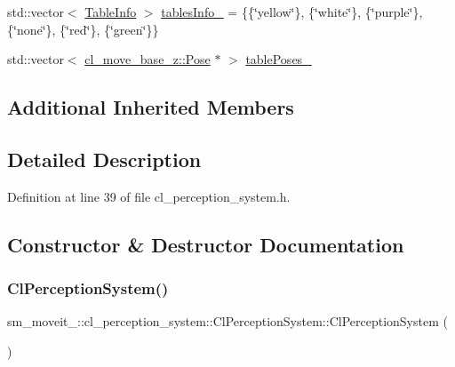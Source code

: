 \begin{DoxyCompactItemize}
\item 
std\+::vector$<$ \hyperlink{structsm__moveit__4_1_1cl__perception__system_1_1TableInfo}{Table\+Info} $>$ \hyperlink{classsm__moveit__4_1_1cl__perception__system_1_1ClPerceptionSystem_a21ceecf8b19768639b21493c2d822ec2}{tables\+Info\+\_\+} = \{\{\char`\"{}yellow\char`\"{}\}, \{\char`\"{}white\char`\"{}\}, \{\char`\"{}purple\char`\"{}\}, \{\char`\"{}none\char`\"{}\}, \{\char`\"{}red\char`\"{}\}, \{\char`\"{}green\char`\"{}\}\}
\item 
std\+::vector$<$ \hyperlink{classcl__move__base__z_1_1Pose}{cl\+\_\+move\+\_\+base\+\_\+z\+::\+Pose} $\ast$ $>$ \hyperlink{classsm__moveit__4_1_1cl__perception__system_1_1ClPerceptionSystem_a3a1e9a71ee18c12bac7d76810c164996}{table\+Poses\+\_\+}
\end{DoxyCompactItemize}
\subsection*{Additional Inherited Members}


\subsection{Detailed Description}


Definition at line 39 of file cl\+\_\+perception\+\_\+system.\+h.



\subsection{Constructor \& Destructor Documentation}
\mbox{\label{classsm__moveit__4_1_1cl__perception__system_1_1ClPerceptionSystem_aeb969985d995c4ba91f1f2f693fe2c3a}} 
\subsubsection{\texorpdfstring{Cl\+Perception\+System()}{ClPerceptionSystem()}}
{\footnotesize\ttfamily sm\+\_\+moveit\+\_\+::cl\+\_\+perception\+\_\+system\+::\+Cl\+Perception\+System\+::\+Cl\+Perception\+System (\begin{DoxyParamCaption}{ }\end{DoxyParamCaption})\hspace{0.3cm}{\ttfamily [inline]}}



